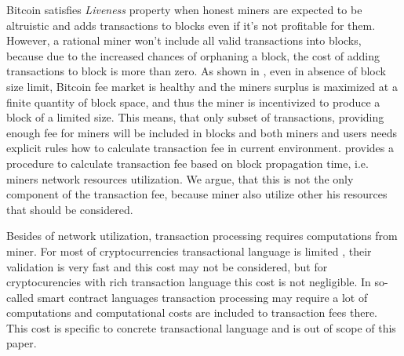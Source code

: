 \documentclass[]{article}   %
\newcommand{\authnote}[2]{\marginpar{\parbox{\marginparwidth}{\tiny %
  \textsf{#1 {\textcolor{blue}{notes: #2}}}}}%
  \textcolor{blue}{\textbf{\dag}}}
\newcommand{\authnote}[2]{
  \textsf{#1 \textcolor{blue}{: #2}}}
\newcommand{\authnote}[2]{}
\newcommand{\knote}[1]{{\authnote{\textcolor{green}{Alex notes}}{#1}}}
\newcommand{\dnote}[1]{{\authnote{\textcolor{blue}{Dima notes}}{#1}}}
\begin{document}
Bitcoin satisfies \textit{Liveness} property when honest miners are expected to be altruistic and adds transactions to blocks even if it's not profitable for them. However, a rational miner won't include all valid transactions into blocks, because due to the increased chances of orphaning a block, the cost of adding transactions to block is more than zero\cite{rizun2015transaction, andresen2013}. As shown in \cite{rizun2015transaction}, even in absence of block size limit, Bitcoin fee market is healthy and the miners surplus is maximized at a finite quantity of block space, and thus the miner is incentivized to produce a block of a limited size. This means, that only subset of transactions, providing enough fee for miners will be included in blocks and both miners and users needs explicit rules how to calculate transaction fee in current environment. \knote{Isn't this claim way too bold and unproven?} \cite{rizun2015transaction} provides a procedure to calculate transaction fee based on block propagation time, i.e. miners network resources utilization. We argue, that this is not the only component of the transaction fee, because miner also utilize other his resources that should be considered.

Besides of network utilization, transaction processing requires computations from miner. For most of cryptocurrencies transactional language is limited \cite{script}, their validation is very fast and this cost may not be considered, but for cryptocurencies with rich transaction language \dnote{more links e.g. for sigma-state} this cost is not negligible. In so-called smart contract languages \cite{seijas2016scripting, tezosScript, solidity} transaction processing may require a lot of computations and computational costs are included to transaction fees there. This cost is specific to concrete transactional language and is out of scope of this paper.
\end{document}
